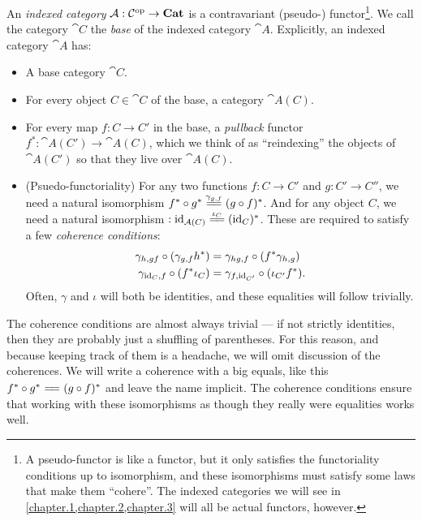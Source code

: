 \documentclass[DynamicalBook]{subfiles}
\begin{document}
\begin{definition}
  An \emph{indexed category} $\mathcal{A} : \mathcal{C}^{\textnormal{op}} \to \textbf{Cat}$ is a
  contravariant (pseudo-) functor\footnote{A pseudo-functor is like a functor,
    but it only satisfies the functoriality conditions up to isomorphism, and
    these isomorphisms must satisfy some laws that make them ``cohere''. The
    indexed categories we will see in \cref{chapter.1,chapter.2,chapter.3}
    will all be actual functors, however.}. We call the category $\cat{C}$ the
  \emph{base} of the indexed category $\cat{A}$. Explicitly, an indexed
  category $\cat{A}$ has:
  \begin{itemize}
  \item A base category $\cat{C}$.
  \item For every object $C \in \cat{C}$ of the base, a category $\cat{A}(C)$.
  \item For every map $f : C \to C'$ in the base, a \emph{pullback} functor
    $f^{\ast} : \cat{A}(C') \to \cat{A}(C)$, which we think of as ``reindexing''
    the objects of $\cat{A}(C')$ so that they live over $\cat{A}(C)$.
  \item (Psuedo-functoriality) For any two functions $f : C \to C'$ and $g : C' \to C''$, we need a
    natural isomorphism $f^{\ast} \circ g^{\ast} \xequals{\gamma_{g, f}} (g \circ
    f)^{\ast}$. And for any object $C$, we need a natural isomorphism $:
    \id_{\cat{A}(C)} \xequals{\iota_C } (\id_C)^{\ast}$. These are required to satisfy a
    few \emph{coherence conditions}:
\begin{align}
  \gamma_{h,gf} \circ (\gamma_{g, f}h^{\ast}) &= \gamma_{hg, f} \circ (f^{\ast}\gamma_{h, g}) \\
  \gamma_{\mathrm{id}_C, f} \circ (f^{\ast}\iota_C) &= \gamma_{f, \mathrm{id}_{C'}} \circ (\iota_{C'} f^{\ast}).
\end{align}
   Often, $\gamma$ and $\iota$ will both be identities, and these equalities
   will follow trivially.
  \end{itemize}
\end{definition}

\begin{remark}\label{rmk.coherence_condition_indexed_cat}
  The coherence conditions are almost always trivial --- if not strictly
  identities, then they are probably just a shuffling of parentheses. For this
  reason, and because keeping track of them is a headache, we will omit
  discussion of the coherences. We will write a coherence with a big equals,
  like this $f^{\ast} \circ g^{\ast} \xequals{\phantom{ \gamma_{g, f} }} (g \circ
    f)^{\ast}$ and leave the name implicit. The coherence conditions ensure that
    working with these isomorphisms as though they really were equalities works well.
\end{remark}
\end{document}
